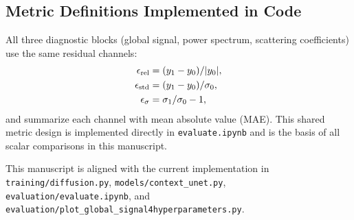 \documentclass{aastex631}
\begin{document}
\subsection{Metric Definitions Implemented in Code}
All three diagnostic blocks (global signal, power spectrum, scattering coefficients) use the same residual channels:
\begin{align}
\epsilon_{\rm rel} &= (y_1-y_0)/|y_0|, \\
\epsilon_{\rm std} &= (y_1-y_0)/\sigma_0, \\
\epsilon_{\sigma} &= \sigma_1/\sigma_0-1,
\end{align}
and summarize each channel with mean absolute value (MAE). This shared metric design is implemented directly in \texttt{evaluate.ipynb} and is the basis of all scalar comparisons in this manuscript.

\acknowledgments
This manuscript is aligned with the current implementation in
\texttt{training/diffusion.py},
\texttt{models/context\_unet.py},
\texttt{evaluation/evaluate.ipynb}, and
\texttt{evaluation/plot\_global\_signal4hyperparameters.py}.

{}

\end{document}
